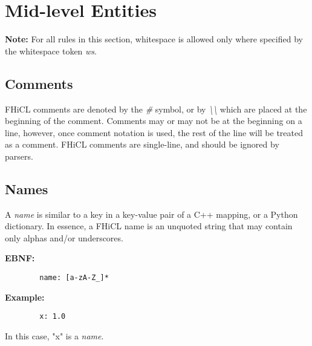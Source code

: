 \documentclass{memarticle}
\begin{document}
{        \section{Mid-level Entities}
                \textbf{ Note: } For all rules in this section,
                whitespace is allowed only where specified by the whitespace token \emph{ws}.
                \subsection{Comments}
                        FHiCL comments are denoted by the \emph{\#} symbol,
                        or by \emph{\textbackslash\textbackslash}
                        which are placed at the beginning of the comment.
                        Comments may or may not be at the beginning on a line,
                        however, once comment notation is used, 
                        the rest of the line will be treated as a comment.
                        FHiCL comments are single-line,
                        and should be ignored by parsers.
                \subsection{Names}
                        A \emph{name} is similar to a key in a key-value pair of a C++ mapping, or a Python dictionary.
                        In essence, a FHiCL name is an unquoted string that may contain only alphas and/or underscores.
                        \par\textbf{EBNF:}
                        \begin{verbatim}
        name: [a-zA-Z_]*
                        \end{verbatim}
                        \par\textbf{Example:}
                        \begin{verbatim}
        x: 1.0
                        \end{verbatim}
                        In this case, 
                        "x" is a \emph{name}.
}
\end{document}
